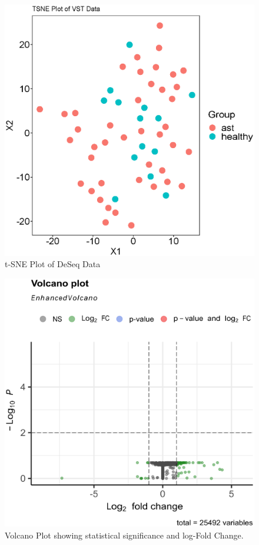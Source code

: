 \documentclass[pdflatex,sn-mathphys]{sn-jnl}%
\theoremstyle{thmstyleone}%
\theoremstyle{thmstyletwo}%
\theoremstyle{thmstylethree}%
\begin{document}
\begin{figure}[ht!]
    \centering
    \includegraphics[scale=0.4]{plots/assn2/tsne_plot.eps}
    \caption{t-SNE Plot of DeSeq Data}
    \label{fig:tsne}
\end{figure}
\begin{figure}[h!]
    \centering
    \includegraphics[scale=0.5]{plots/assn2/volcano_plot.eps}
    \caption{Volcano Plot showing statistical significance and log-Fold Change.}
    \label{fig:volcano}
\end{figure}
\end{document}
